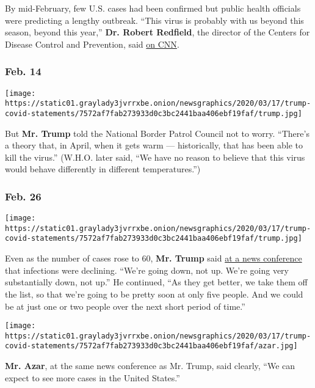 By mid-February, few U.S. cases had been confirmed but public health
officials were predicting a lengthy outbreak. ``This virus is probably
with us beyond this season, beyond this year,'' \textbf{Dr. Robert
Redfield}, the director of the Centers for Disease Control and
Prevention, said
\href{https://www.cnn.com/2020/02/13/health/coronavirus-cdc-robert-redfield-gupta-intv/index.html}{on
CNN}.

\hypertarget{feb-14}{%
\subsubsection{Feb. 14}\label{feb-14}}

\texttt{[image: https://static01.graylady3jvrrxbe.onion/newsgraphics/2020/03/17/trump-covid-statements/7572af7fab273933d0c3bc2441baa406ebf19faf/trump.jpg]}

But \textbf{Mr. Trump} told the National Border Patrol Council not to
worry. ``There's a theory that, in April, when it gets warm ---
historically, that has been able to kill the virus.'' (W.H.O. later
said, ``We have no reason to believe that this virus would behave
differently in different temperatures.'')

\hypertarget{feb-26}{%
\subsubsection{Feb. 26}\label{feb-26}}

\texttt{[image: https://static01.graylady3jvrrxbe.onion/newsgraphics/2020/03/17/trump-covid-statements/7572af7fab273933d0c3bc2441baa406ebf19faf/trump.jpg]}

Even as the number of cases rose to 60, \textbf{Mr. Trump} said
\href{https://www.whitehouse.gov/briefings-statements/remarks-president-trump-vice-president-pence-members-coronavirus-task-force-press-conference/}{at
a news conference} that infections were declining. ``We're going down,
not up. We're going very substantially down, not up.'' He continued,
``As they get better, we take them off the list, so that we're going to
be pretty soon at only five people. And we could be at just one or two
people over the next short period of time.''

\texttt{[image: https://static01.graylady3jvrrxbe.onion/newsgraphics/2020/03/17/trump-covid-statements/7572af7fab273933d0c3bc2441baa406ebf19faf/azar.jpg]}

\textbf{Mr. Azar}, at the same news conference as Mr. Trump, said
clearly, ``We can expect to see more cases in the United States.''

